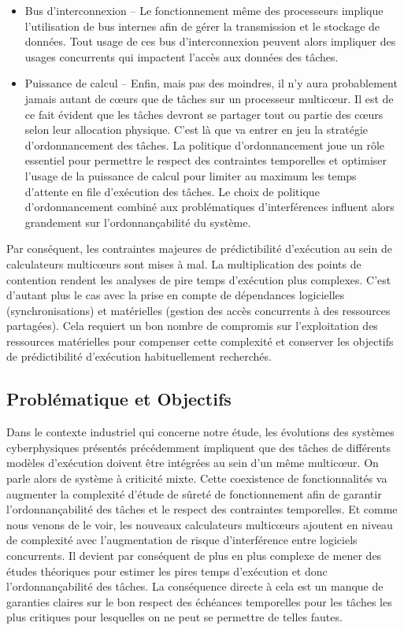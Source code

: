 \documentclass[french, a4paper, 11pt, twoside, pdftex]{StyleThese}
\begin{document}
\begin{itemize}
		\item Bus d'interconnexion -- 
			Le fonctionnement même des processeurs implique l'utilisation de bus internes afin de gérer la transmission et le stockage de données. Tout usage de ces bus d'interconnexion peuvent alors impliquer des usages concurrents qui impactent l'accès aux données des tâches.
		\item Puissance de calcul -- 
			Enfin, mais pas des moindres, il n'y aura probablement jamais autant de cœurs que de tâches sur un processeur multicœur. Il est de ce fait évident que les tâches devront se partager tout ou partie des cœurs selon leur allocation physique. C'est là que va entrer en jeu la stratégie d'ordonnancement des tâches. La politique d'ordonnancement joue un rôle essentiel pour permettre le respect des contraintes temporelles et optimiser l'usage de la puissance de calcul pour limiter au maximum les temps d'attente en file d'exécution des tâches. Le choix de politique d'ordonnancement combiné aux problématiques d'interférences influent alors grandement sur l'ordonnançabilité du système.
	\end{itemize}

	Par conséquent, les contraintes majeures de prédictibilité d'exécution au sein de calculateurs multicœurs sont mises à mal. La multiplication des points de contention rendent les analyses de pire temps d'exécution plus complexes. C'est d'autant plus le cas avec la prise en compte de dépendances logicielles (synchronisations) et matérielles (gestion des accès concurrents à des ressources partagées). Cela requiert un bon nombre de compromis sur l'exploitation des ressources matérielles pour compenser cette complexité et conserver les objectifs de prédictibilité d'exécution habituellement recherchés.

\subsection{Problématique et Objectifs}
		Dans le contexte industriel qui concerne notre étude, les évolutions des systèmes cyberphysiques présentés précédemment impliquent que des tâches de différents modèles d'exécution doivent être intégrées au sein d'un même multicœur. On parle alors de système à criticité mixte. Cette coexistence de fonctionnalités va augmenter la complexité d'étude de sûreté de fonctionnement afin de garantir l'ordonnançabilité des tâches et le respect des contraintes temporelles. Et comme nous venons de le voir, les nouveaux calculateurs multicœurs ajoutent en niveau de complexité avec l'augmentation de risque d'interférence entre logiciels concurrents. Il devient par conséquent de plus en plus complexe de mener des études théoriques pour estimer les pires temps d'exécution et donc l'ordonnançabilité des tâches. La conséquence directe à cela est un manque de garanties claires sur le bon respect des échéances temporelles pour les tâches les plus critiques pour lesquelles on ne peut se permettre de telles fautes.
		
\end{document}
